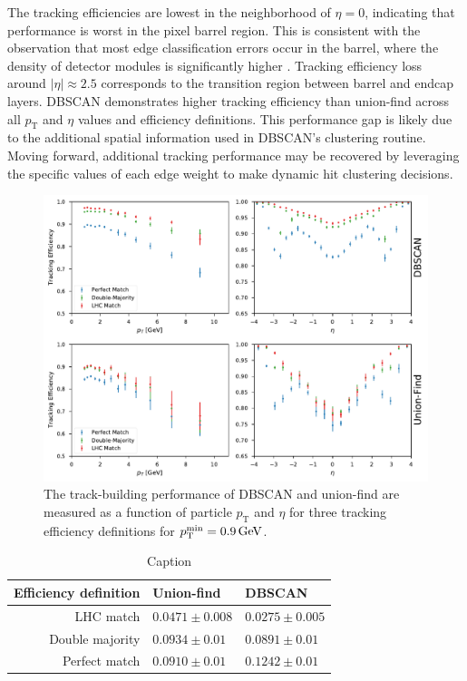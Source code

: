 \documentclass[twocolumn]{svjour3}
\newcommand{\pt}{\ensuremath{p_{\mathrm{T}}}\xspace}
\newcommand{\GeV}{\ensuremath{\,\text{Ge\hspace{-.08em}V}}\xspace}
\begin{document}
The tracking efficiencies are lowest in the neighborhood of $\eta=0$, indicating that performance is worst in the pixel barrel region.
This is consistent with the observation that most edge classification errors occur in the barrel, where the density of detector modules is significantly higher \cite{TrackML}. 
Tracking efficiency loss around $|\eta|\approx 2.5$ corresponds to the transition region between barrel and endcap layers. 
DBSCAN demonstrates higher tracking efficiency than union-find across all $\pt$ and $\eta$ values and efficiency definitions. 
This performance gap is likely due to the additional spatial information used in DBSCAN's clustering routine. 
Moving forward, additional tracking performance may be recovered by leveraging the specific values of each edge weight to make dynamic hit clustering decisions.


\begin{figure}[!htbp]
\centering
\includegraphics[width=2\columnwidth,clip]{tracking_efficiencies.pdf}
\caption{The track-building performance of DBSCAN and union-find are measured as a function of particle $\pt$ and $\eta$ for three tracking efficiency definitions for $\pt^\mathrm{min}=0.9\GeV$. }
\label{fig:tracking-effs}
\end{figure}

\begin{table}[!htbp]
    \centering
    \begin{tabular}{r|ll}
        Efficiency definition & Union-find & DBSCAN\\
        \hline
        LHC match & $0.0471\pm0.008$ & $0.0275\pm0.005$\\
        Double majority & $0.0934\pm0.01$ & $0.0891\pm0.01$\\
        Perfect match & $0.0910\pm0.01$ & $0.1242\pm0.01$\\
    \end{tabular}
    \caption{Caption}
    \label{tab:fake-rate}
\end{table}
\end{document}
